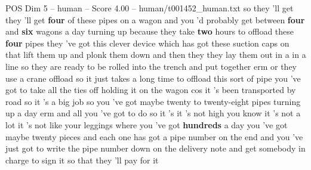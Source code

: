 \begin{textsample}{POS Dim 5 – human – Score 4.00 – human/t001452\_human.txt}  \label{ex:f5_pos_014}
so they 'll get they 'll get \textbf{four} of these pipes on a wagon and you 'd probably get between \textbf{four} and \textbf{six} wagons a day turning up because they take \textbf{two} hours to offload these \textbf{four} pipes they 've got this clever device which has got these suction caps on that lift them up and plonk them down and then they they lay them out in a in a line so they are ready to be rolled into the trench and put together erm or they use a crane offload so it just takes a long time to offload this sort of pipe you 've got to take all the ties off holding it on the wagon cos it 's been transported by road so it 's a big job so you 've got maybe twenty to twenty-eight pipes turning up a day erm and all you 've got to do so it 's it 's not high you know it 's not a lot it 's not like your leggings where you 've got \textbf{hundreds} a day you 've got maybe twenty pieces and each one has got a pipe number on the end and you 've just got to write the pipe number down on the delivery note and get somebody in charge to sign it so that they 'll pay for it

\end{textsample}
